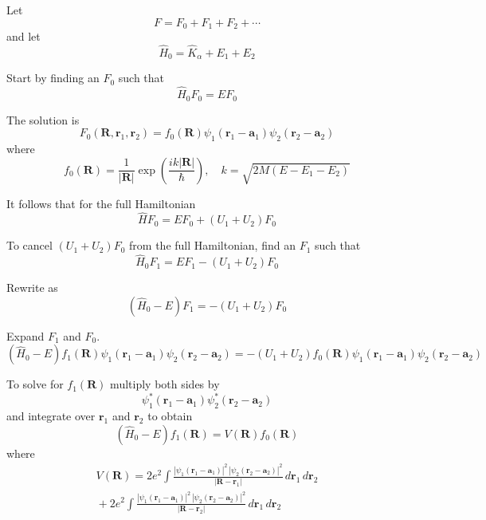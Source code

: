 \documentclass[12pt]{article}
\begin{document}
Let
\begin{equation*}
F=F_0+F_1+F_2+\cdots
\end{equation*}
and let
\begin{equation*}
\hat H_0=\hat K_\alpha+E_1+E_2
\end{equation*}

Start by finding an $F_0$ such that
\begin{equation*}
\hat H_0F_0=EF_0
\end{equation*}

The solution is
\begin{equation*}
F_0(\mathbf R,\mathbf r_1,\mathbf r_2)=f_0(\mathbf R)\psi_1(\mathbf r_1-\mathbf a_1)\psi_2(\mathbf r_2-\mathbf a_2)
\tag{1}
\end{equation*}
where
\begin{equation*}
f_0(\mathbf R)=\frac{1}{|\mathbf R|}\exp\left(\frac{ik|\mathbf R|}{\hbar}\right),\quad k=\sqrt{2M(E-E_1-E_2)}
\end{equation*}

It follows that for the full Hamiltonian
\begin{equation*}
\hat HF_0=EF_0+(U_1+U_2)F_0
\end{equation*}

To cancel $(U_1+U_2)F_0$ from the full Hamiltonian, find an $F_1$ such that
\begin{equation*}
\hat H_0F_1=EF_1-(U_1+U_2)F_0
\end{equation*}

Rewrite as
\begin{equation*}
\left(\hat H_0-E\right)F_1=-(U_1+U_2)F_0
\end{equation*}

Expand $F_1$ and $F_0$.
\begin{equation*}
\left(\hat H_0-E\right)f_1(\mathbf R)\psi_1(\mathbf r_1-\mathbf a_1)\psi_2(\mathbf r_2-\mathbf a_2)
=-(U_1+U_2)f_0(\mathbf R)\psi_1(\mathbf r_1-\mathbf a_1)\psi_2(\mathbf r_2-\mathbf a_2)
\end{equation*}

To solve for $f_1(\mathbf R)$ multiply both sides by
\begin{equation*}
\psi_1^*(\mathbf r_1-\mathbf a_1)\psi_2^*(\mathbf r_2-\mathbf a_2)
\end{equation*}
and integrate over $\mathbf r_1$ and $\mathbf r_2$ to obtain
\begin{equation*}
\left(\hat H_0-E\right)f_1(\mathbf R)
=V(\mathbf R)f_0(\mathbf R)
\tag{2}
\end{equation*}
where
\begin{multline*}
V(\mathbf R)
=2e^2\int\frac{|\psi_1(\mathbf r_1-\mathbf a_1)|^2\,|\psi_2(\mathbf r_2-\mathbf a_2)|^2}{|\mathbf R-\mathbf r_1|}
\,d\mathbf r_1\,d\mathbf r_2
\\
{}+2e^2\int\frac{|\psi_1(\mathbf r_1-\mathbf a_1)|^2\,|\psi_2(\mathbf r_2-\mathbf a_2)|^2}{|\mathbf R-\mathbf r_2|}
\,d\mathbf r_1\,d\mathbf r_2
\end{multline*}
\end{document}
